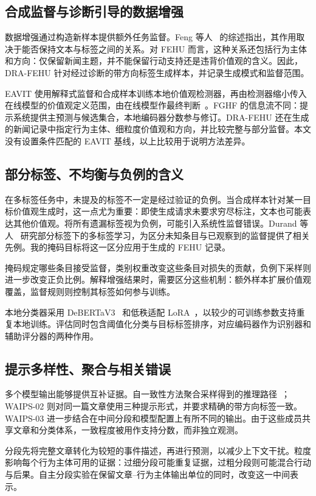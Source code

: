 \documentclass[12pt,a4paper]{article}
\begin{document}
\subsection{合成监督与诊断引导的数据增强}
数据增强通过构造新样本提供额外任务监督。Feng 等人~\cite{feng2021} 的综述指出，其作用取决于能否保持文本与标签之间的关系。对 FEHU 而言，这种关系还包括行为主体和方向：仅保留新闻主题，并不能保留行动支持还是违背价值观的含义。因此，DRA-FEHU 针对经过诊断的带方向标签生成样本，并记录生成模式和监督范围。

EAVIT 使用解释式监督和合成样本训练本地价值观检测器，再由检测器缩小传入在线模型的价值观定义范围，由在线模型作最终判断~\cite{eavit}。FGHF 的信息流不同：提示系统提供主预测与候选集合，本地编码器分数参与修订。DRA-FEHU 还在生成的新闻记录中指定行为主体、细粒度价值观和方向，并比较完整与部分监督。本文没有设置条件匹配的 EAVIT 基线，以上比较用于说明方法差异。


\subsection{部分标签、不均衡与负例的含义}
在多标签任务中，未提及的标签不一定是经过验证的负例。当合成样本针对某一目标价值观生成时，这一点尤为重要：即使生成请求未要求穷尽标注，文本也可能表达其他价值观。将所有遗漏标签视为负例，可能引入系统性监督错误。Durand 等人~\cite{durand2019} 研究部分标签下的多标签学习，为区分未知条目与已观察到的监督提供了相关先例。我的掩码目标将这一区分应用于生成的 FEHU 记录。

掩码规定哪些条目接受监督，类别权重改变这些条目对损失的贡献，负例下采样则进一步改变正负比例。解释增强结果时，需要区分这些机制：额外样本扩展价值观覆盖，监督规则则控制其标签如何参与训练。

本地分类器采用 DeBERTaV3~\cite{debertav3} 和低秩适配 LoRA~\cite{lora}，以较少的可训练参数支持重复本地训练。评估同时包含阈值化分类与目标标签排序，对应编码器作为识别器和辅助评分器的两种作用。

\subsection{提示多样性、聚合与相关错误}
多个模型输出能够提供互补证据。自一致性方法聚合采样得到的推理路径~\cite{selfconsistency}；WAIPS-02 则对同一篇文章使用三种提示形式，并要求精确的带方向标签一致。WAIPS-03 进一步结合在中间分段和模型配置上有所不同的输出。由于这些成员共享文章和分类体系，一致程度被用作支持分数，而非独立观测。


分段先将完整文章转化为较短的事件描述，再进行预测，以减少上下文干扰。粒度影响每个行为主体可用的证据：过细分段可能重复证据，过粗分段则可能混合行动与后果。自主分段实验在保留文章--行为主体输出单位的同时，改变这一中间表示。
\end{document}
